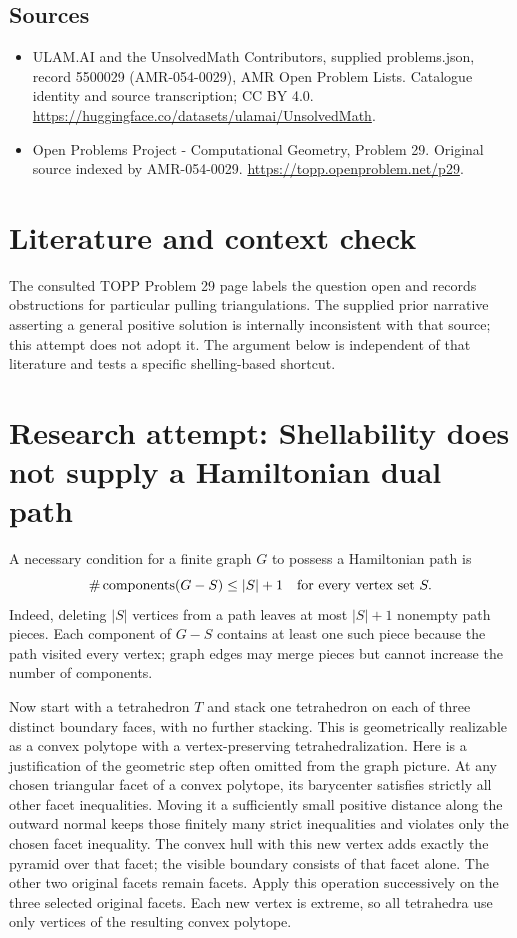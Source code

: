 \documentclass[11pt,a4paper]{article}
\begin{document}
\subsection{Sources}
\begin{itemize}
\item[S1] ULAM.AI and the UnsolvedMath Contributors, supplied problems.json, record 5500029 (AMR-054-0029), AMR Open Problem Lists. Catalogue identity and source transcription; CC BY 4.0.
\url{https://huggingface.co/datasets/ulamai/UnsolvedMath}.
\item[S2] Open Problems Project - Computational Geometry, Problem 29. Original source indexed by AMR-054-0029.
\url{https://topp.openproblem.net/p29}.
\end{itemize}

\section{Literature and context check}
The consulted TOPP Problem 29 page labels the question open and records
obstructions for particular pulling triangulations. The supplied prior narrative
asserting a general positive solution is internally inconsistent with that source;
this attempt does not adopt it. The argument below is independent of that
literature and tests a specific shelling-based shortcut.
\section{Research attempt: Shellability does not supply a Hamiltonian dual path}
A necessary condition for a finite graph $G$ to possess a Hamiltonian path is
\[
 \#\operatorname{components}(G-S)\le |S|+1
 \quad\hbox{for every vertex set }S.
\]
Indeed, deleting $|S|$ vertices from a path leaves at most $|S|+1$ nonempty
path pieces. Each component of $G-S$ contains at least one such piece because
the path visited every vertex; graph edges may merge pieces but cannot increase
the number of components.

Now start with a tetrahedron $T$ and stack one tetrahedron on each of three
distinct boundary faces, with no further stacking. This is geometrically
realizable as a convex polytope with a vertex-preserving tetrahedralization.
Here is a justification of the geometric step often omitted from the graph
picture. At any chosen triangular facet of a convex polytope, its barycenter
satisfies strictly all other facet inequalities. Moving it a sufficiently small
positive distance along the outward normal keeps those finitely many strict
inequalities and violates only the chosen facet inequality. The convex hull
with this new vertex adds exactly the pyramid over that facet; the visible
boundary consists of that facet alone. The other two original facets remain
facets. Apply this operation successively on the three selected original facets.
Each new vertex is extreme, so all tetrahedra use only vertices of the resulting
convex polytope.
\end{document}
